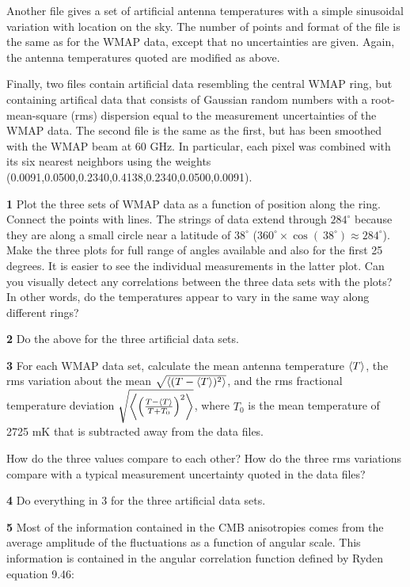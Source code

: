 \documentclass[12pt]{article}
\begin{document}
Another file gives a set of artificial antenna temperatures with a simple sinusoidal variation with location on the sky. The number of points and format of the file is the same as for the WMAP data, except that no uncertainties are given. Again, the antenna temperatures quoted are modified as above.

Finally, two files contain artificial data resembling the central WMAP ring, but containing artifical data that consists of Gaussian random numbers with a root-mean-square (rms) dispersion equal to the measurement uncertainties of the WMAP data. The second file is the same as the first, but has been smoothed with the WMAP beam at 60 GHz. In particular, each pixel was combined with its six nearest neighbors using the weights (0.0091,0.0500,0.2340,0.4138,0.2340,0.0500,0.0091).

\textbf{1} Plot the three sets of WMAP data as a function of position along the ring. Connect the points with lines. The strings of data extend through \(284^\circ\) because they are along a small circle near a latitude of \(38^\circ\) (\(360^\circ  \times \cos(~38^\circ) \approx 284^\circ\)). Make the three plots for full range of angles available and also for the first 25 degrees. It is easier to see the individual measurements in the latter plot. Can you visually detect any correlations between the three data sets with the plots? In other words, do the temperatures appear to vary in the same way along different rings?

\textbf{2} Do the above for the three artificial data sets.

\textbf{3} For each WMAP data set, calculate the mean antenna temperature \(\left< T\right>\), the rms variation about the mean \(\sqrt{\left<  (T-\left< T\right>)^2 \right>}\), and the rms fractional temperature deviation \(\sqrt{\left<  \left(\frac{T-\left< T\right>}{T+T_{0}}\right)^2 \right>}\), where \(T_0\) is the mean temperature of 2725 mK that is subtracted away from the data files. 

How do the three values compare to each other? How do the three rms variations compare with a typical measurement uncertainty quoted in the data files?

\textbf{4} Do everything in 3 for the three artificial data sets.

\textbf{5} Most of the information contained in the CMB anisotropies comes from the average amplitude of the fluctuations as a function of angular scale. This information is contained in the angular correlation function defined by Ryden equation 9.46:
\end{document}
